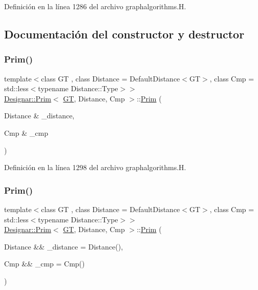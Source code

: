 Definición en la línea 1286 del archivo graphalgorithms.\+H.



\subsection{Documentación del constructor y destructor}
\mbox{\label{class_designar_1_1_prim_a72499b6f863776f135b39977e8c981bf}} 
\subsubsection{\texorpdfstring{Prim()}{Prim()}\hspace{0.1cm}{\footnotesize\ttfamily [1/2]}}
{\footnotesize\ttfamily template$<$class GT , class Distance  = Default\+Distance$<$\+G\+T$>$, class Cmp  = std\+::less$<$typename Distance\+::\+Type$>$$>$ \\
\hyperlink{class_designar_1_1_prim}{Designar\+::\+Prim}$<$ \hyperlink{demo-buildgraph_8_c_a3001c40d2c31ca87ed96cd7d1334a55e}{GT}, Distance, Cmp $>$\+::\hyperlink{class_designar_1_1_prim}{Prim} (\begin{DoxyParamCaption}\item[{Distance \&}]{\+\_\+distance,  }\item[{Cmp \&}]{\+\_\+cmp }\end{DoxyParamCaption})\hspace{0.3cm}{\ttfamily [inline]}}



Definición en la línea 1298 del archivo graphalgorithms.\+H.

\mbox{\label{class_designar_1_1_prim_abf866c064ed21f9be1ccb60ed9df84c1}} 
\subsubsection{\texorpdfstring{Prim()}{Prim()}\hspace{0.1cm}{\footnotesize\ttfamily [2/2]}}
{\footnotesize\ttfamily template$<$class GT , class Distance  = Default\+Distance$<$\+G\+T$>$, class Cmp  = std\+::less$<$typename Distance\+::\+Type$>$$>$ \\
\hyperlink{class_designar_1_1_prim}{Designar\+::\+Prim}$<$ \hyperlink{demo-buildgraph_8_c_a3001c40d2c31ca87ed96cd7d1334a55e}{GT}, Distance, Cmp $>$\+::\hyperlink{class_designar_1_1_prim}{Prim} (\begin{DoxyParamCaption}\item[{Distance \&\&}]{\+\_\+distance = {\ttfamily Distance()},  }\item[{Cmp \&\&}]{\+\_\+cmp = {\ttfamily Cmp()} }\end{DoxyParamCaption})\hspace{0.3cm}{\ttfamily [inline]}}



